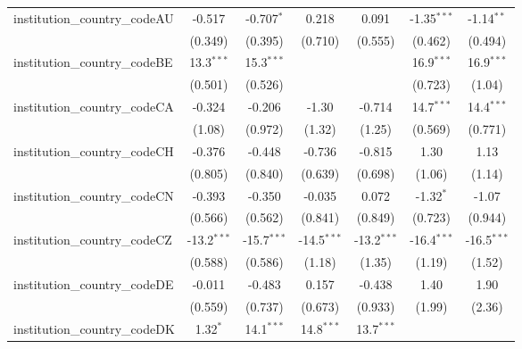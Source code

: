 \begin{tabular}{lcccccc}
   institution\_country\_codeAU          & -0.517        & -0.707$^{*}$  & 0.218         & 0.091         & -1.35$^{***}$ & -1.14$^{**}$\\   
                                         & (0.349)       & (0.395)       & (0.710)       & (0.555)       & (0.462)       & (0.494)\\   
   institution\_country\_codeBE          & 13.3$^{***}$  & 15.3$^{***}$  &               &               & 16.9$^{***}$  & 16.9$^{***}$\\   
                                         & (0.501)       & (0.526)       &               &               & (0.723)       & (1.04)\\   
   institution\_country\_codeCA          & -0.324        & -0.206        & -1.30         & -0.714        & 14.7$^{***}$  & 14.4$^{***}$\\   
                                         & (1.08)        & (0.972)       & (1.32)        & (1.25)        & (0.569)       & (0.771)\\   
   institution\_country\_codeCH          & -0.376        & -0.448        & -0.736        & -0.815        & 1.30          & 1.13\\   
                                         & (0.805)       & (0.840)       & (0.639)       & (0.698)       & (1.06)        & (1.14)\\   
   institution\_country\_codeCN          & -0.393        & -0.350        & -0.035        & 0.072         & -1.32$^{*}$   & -1.07\\   
                                         & (0.566)       & (0.562)       & (0.841)       & (0.849)       & (0.723)       & (0.944)\\   
   institution\_country\_codeCZ          & -13.2$^{***}$ & -15.7$^{***}$ & -14.5$^{***}$ & -13.2$^{***}$ & -16.4$^{***}$ & -16.5$^{***}$\\   
                                         & (0.588)       & (0.586)       & (1.18)        & (1.35)        & (1.19)        & (1.52)\\   
   institution\_country\_codeDE          & -0.011        & -0.483        & 0.157         & -0.438        & 1.40          & 1.90\\   
                                         & (0.559)       & (0.737)       & (0.673)       & (0.933)       & (1.99)        & (2.36)\\   
   institution\_country\_codeDK          & 1.32$^{*}$    & 14.1$^{***}$  & 14.8$^{***}$  & 13.7$^{***}$  &               &   \\   

\end{tabular}
